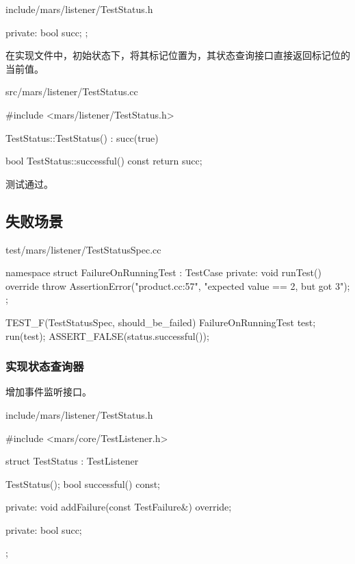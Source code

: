 \begin{content}
\begin{nodiff}{include/mars/listener/TestStatus.h}
\begin{c++}
{private:
  bool succ;
};
 \end{c++}
\end{nodiff}

在实现文件中，初始状态下，将其标记位置为，其状态查询接口直接返回标记位的当前值。

\begin{nodiff}{src/mars/listener/TestStatus.cc}
 \begin{c++}
#include <mars/listener/TestStatus.h>

TestStatus::TestStatus() : succ(true) {
}

bool TestStatus::successful() const {
  return succ;
}
 \end{c++}
\end{nodiff}

测试通过。

\subsection{失败场景}

\begin{nodiff}{test/mars/listener/TestStatusSpec.cc}
 \begin{c++}
namespace {
  struct FailureOnRunningTest : TestCase {
  private:
    void runTest() override {
      throw AssertionError("product.cc:57", "expected value == 2, but got 3");
    }
  };
}

TEST_F(TestStatusSpec, should_be_failed) {
  FailureOnRunningTest test;
  run(test);
  ASSERT_FALSE(status.successful());
}
 \end{c++}
\end{nodiff}

\subsubsection{实现状态查询器}

增加事件监听接口。

\begin{nodiff}{include/mars/listener/TestStatus.h}
 \begin{c++}
#include <mars/core/TestListener.h>

struct TestStatus : TestListener {
  TestStatus();
  bool successful() const;

private:
  void addFailure(const TestFailure&) override;

private:
  bool succ;
};
 \end{c++}
\end{nodiff}


\end{content}
